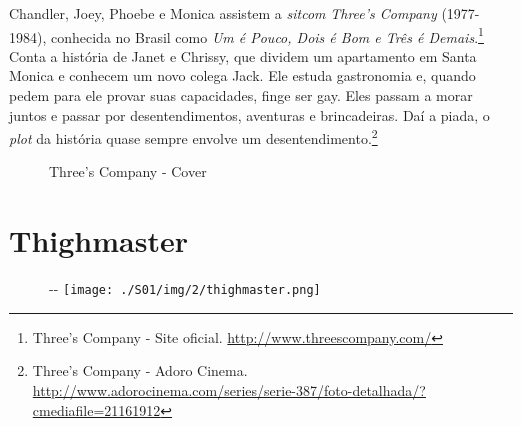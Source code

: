 \saveparinfos
\noindent
\begin{minipage}[c]{0.5\textwidth}\useparinfo

Chandler, Joey, Phoebe e Monica assistem a \emph{sitcom} \emph{Three's
Company} (1977-1984), conhecida no Brasil como \emph{Um é Pouco, Dois é
Bom e Três é Demais}.\footnote{\sloppy Three’s Company - Site oficial. \url{http://www.threescompany.com/}}
Conta a história de Janet e Chrissy, que dividem um apartamento em Santa
Monica e conhecem um novo colega Jack. Ele estuda gastronomia e, quando
pedem para ele provar suas capacidades, finge ser gay. Eles passam a
morar juntos e passar por desentendimentos, aventuras e brincadeiras.
Daí a piada, o \emph{plot} da história quase sempre envolve um
desentendimento.\footnote{\sloppy Three’s Company - Adoro Cinema. \url{http://www.adorocinema.com/series/serie-387/foto-detalhada/?cmediafile=21161912}}

\end{minipage}\hfill
\begin{minipage}[c]{0.5\textwidth}

\begin{figure}
  \centering
    \caption{Three’s Company - Cover\label{fig:three-s-company-cover}}
\end{figure}

\end{minipage}

\hypertarget{thighmaster}{%
\section{Thighmaster}\label{thighmaster}}

\begin{figure}[!ht]
  \begin{adjustwidth}{-\oddsidemargin-1in}{-\rightmargin}
    \centering
    \texttt{[image: ./S01/img/2/thighmaster.png]}
  \end{adjustwidth}
\end{figure}

